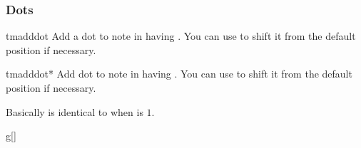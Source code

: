 \documentclass[11pt,a4paper]{ltxdoc}
\begin{document}
\subsubsection{Dots}\label{sec:music-notes:misc:dots}
\begin{docCommand}{tmadddot}{}
  Add a dot to note in  having . You can use 
   to shift it from the default position if necessary.
\end{docCommand}
\begin{docCommand}{tmadddot*}{}
  Add  dot to note in  having 
  . You can use  to shift it from the default 
  position if necessary.

  Basically  is identical to  when 
   is $1$.
\end{docCommand}
\begin{dispExample}
\begin{tmsinglestaff}%
  \begin{tmstaff}{g}[]
  \end{tmstaff}%
\end{tmsinglestaff}
\end{dispExample}
\end{document}
